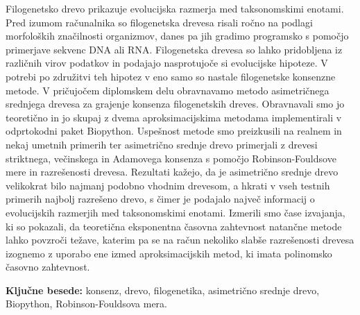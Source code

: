 \documentclass[a4paper, 12pt]{book}
\newcommand{\tkeywords}{konsenz, drevo, filogenetika, asimetrično srednje drevo, Biopython, Robinson-Fouldsova mera}
\newcommand{\clearemptydoublepage}{\newpage{\pagestyle{empty}\cleardoublepage}}
\begin{document}
Filogenetsko drevo prikazuje evolucijska razmerja med taksonomskimi enotami. Pred 
izumom računalnika so filogenetska drevesa risali ročno na podlagi morfoloških 
značilnosti organizmov, danes pa jih gradimo programsko s pomočjo primerjave 
sekvenc DNA ali RNA. Filogenetska drevesa so lahko pridobljena iz različnih virov 
podatkov in podajajo nasprotujoče si evolucijske hipoteze. V potrebi 
po združitvi teh hipotez v eno samo so nastale filogenetske konsenzne metode. 
V pričujočem diplomskem delu obravnavamo metodo asimetričnega srednjega drevesa 
za grajenje konsenza filogenetskih dreves. Obravnavali smo jo teoretično in jo 
skupaj z dvema aproksimacijskima metodama implementirali v odprtokodni paket 
Biopython. Uspešnost metode smo preizkusili na realnem in nekaj umetnih primerih 
ter asimetrično srednje drevo primerjali z drevesi striktnega, večinskega in 
Adamovega konsenza s pomočjo Robinson-Fouldsove mere in razrešenosti drevesa. 
Rezultati kažejo, da je asimetrično srednje drevo velikokrat bilo najmanj podobno 
vhodnim drevesom, a hkrati v vseh testnih primerih najbolj razrešeno drevo, s čimer 
je podajalo največ informacij o evolucijskih razmerjih med taksonomskimi enotami. 
Izmerili smo čase izvajanja, ki so pokazali, da teoretična eksponentna časovna 
zahtevnost natančne metode lahko povzroči težave, katerim pa se na račun nekoliko 
slabše razrešenosti drevesa izognemo z uporabo ene izmed aproksimacijskih metod, 
ki imata polinomsko časovno zahtevnost. 
\bigskip

\noindent\textbf{Ključne besede:} \tkeywords.
\clearemptydoublepage

\end{document}

